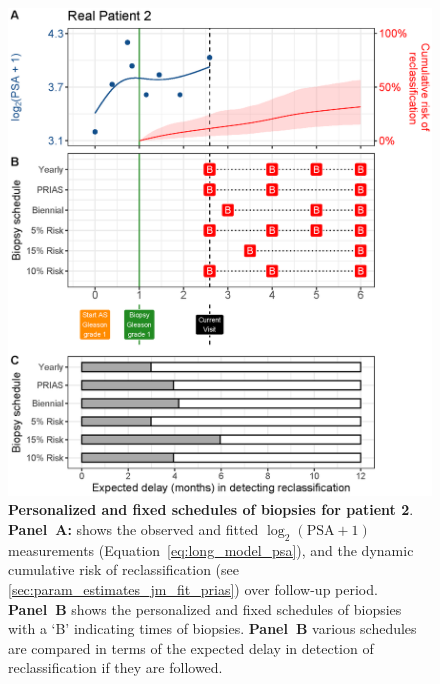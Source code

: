 \begin{figure}
\centerline{\includegraphics[width=\columnwidth]{images/demo_pat2_supp.eps}}
\caption{\textbf{Personalized and fixed schedules of biopsies for patient 2}. \textbf{Panel~A:} shows the observed and fitted $\log_2(\mbox{PSA} + 1)$ measurements (Equation~\ref{eq:long_model_psa}), and the dynamic cumulative risk of reclassification (see \ref{sec:param_estimates_jm_fit_prias}) over follow-up period. \textbf{Panel~B} shows the personalized and fixed schedules of biopsies with a `B' indicating times of biopsies. \textbf{Panel~B} various schedules are compared in terms of the expected delay in detection of reclassification if they are followed.}
\label{fig:demo_pat2_supp}
\end{figure}

